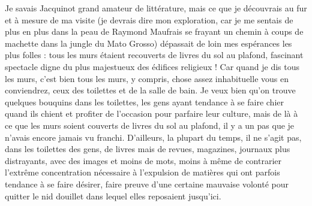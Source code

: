 Je savais Jacquinot grand amateur de littérature, mais ce que je découvrais au fur et à mesure de ma visite (je devrais dire mon exploration, car je me sentais de plus en plus dans la peau de Raymond Maufrais se frayant un chemin à coups de machette dans la jungle du Mato Grosso) dépassait de loin mes espérances les plus folles : tous les murs étaient recouverts de livres du sol au plafond, fascinant spectacle digne du plus majestueux des édifices religieux ! Car quand je dis tous les murs, c’est bien tous les murs, y compris, chose assez inhabituelle vous en conviendrez, ceux des toilettes et de la salle de bain. Je veux bien qu’on trouve quelques bouquins dans les toilettes, les gens ayant tendance à se faire chier quand ils chient et profiter de l’occasion pour parfaire leur culture, mais de là à ce que les murs soient couverts de livres du sol au plafond, il y a un pas que je n’avais encore jamais vu franchi. D’ailleurs, la plupart du temps, il ne s’agit pas, dans les toilettes des gens, de livres mais de revues, magazines, journaux plus distrayants, avec des images et moins de mots, moins à même de contrarier l’extrême concentration nécessaire à l’expulsion de matières qui ont parfois tendance à se faire désirer, faire preuve d’une certaine mauvaise volonté pour quitter le nid douillet dans lequel elles reposaient jusqu’ici.
%
%
% 

